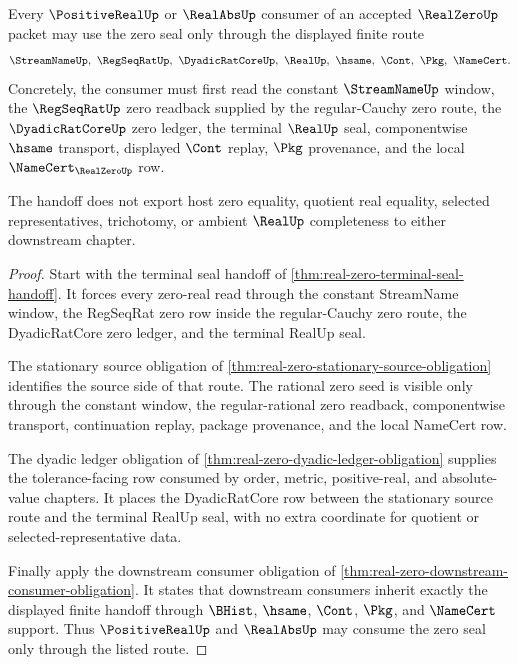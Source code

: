 \begin{theorem}
\label{thm:real-zero-positive-abs-handoff}
Every $\PositiveRealUp$ or $\RealAbsUp$ consumer of an accepted $\RealZeroUp$ packet may use the zero seal only through the displayed finite route
$$
\StreamNameUp,\ \RegSeqRatUp,\ \DyadicRatCoreUp,\ \RealUp,\ \hsame,\ \Cont,\ \Pkg,\ \NameCert .
$$
Concretely, the consumer must first read the constant $\StreamNameUp$ window, the $\RegSeqRatUp$ zero readback supplied by the regular-Cauchy zero route, the $\DyadicRatCoreUp$ zero ledger, the terminal $\RealUp$ seal, componentwise $\hsame$ transport, displayed $\Cont$ replay, $\Pkg$ provenance, and the local $\NameCert_{\RealZeroUp}$ row.

The handoff does not export host zero equality, quotient real equality, selected representatives, trichotomy, or ambient $\RealUp$ completeness to either downstream chapter.
\end{theorem}
\begin{proof}
Start with the terminal seal handoff of \autoref{thm:real-zero-terminal-seal-handoff}. It forces every zero-real read through the constant StreamName window, the RegSeqRat zero row inside the regular-Cauchy zero route, the DyadicRatCore zero ledger, and the terminal RealUp seal.

The stationary source obligation of \autoref{thm:real-zero-stationary-source-obligation} identifies the source side of that route. The rational zero seed is visible only through the constant window, the regular-rational zero readback, componentwise transport, continuation replay, package provenance, and the local NameCert row.

The dyadic ledger obligation of \autoref{thm:real-zero-dyadic-ledger-obligation} supplies the tolerance-facing row consumed by order, metric, positive-real, and absolute-value chapters. It places the DyadicRatCore row between the stationary source route and the terminal RealUp seal, with no extra coordinate for quotient or selected-representative data.

Finally apply the downstream consumer obligation of \autoref{thm:real-zero-downstream-consumer-obligation}. It states that downstream consumers inherit exactly the displayed finite handoff through $\BHist$, $\hsame$, $\Cont$, $\Pkg$, and $\NameCert$ support. Thus $\PositiveRealUp$ and $\RealAbsUp$ may consume the zero seal only through the listed route.
\end{proof}

